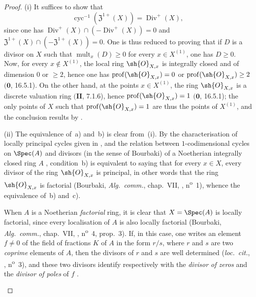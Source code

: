 \begin{proof}
(i) It suffices to show that
\[
\label{IV.21.6.9.1}
  \operatorname{cyc}^{-1}(\mathfrak{Z}^{1+}(X))=\operatorname{Div}^+(X),
  \tag{21.6.9.1}
\]
since one has $\operatorname{Div}^+(X)\cap(-\operatorname{Div}^+(X))=0$ and $\mathfrak{Z}^{1+}(X)\cap(-\mathfrak{Z}^{1+}(X))=0$.
One is thus reduced to proving that if $D$ is a divisor on $X$ such that $\operatorname{mult}_x(D)\geq 0$ for every $x\in X^{(1)}$, one has $D\geq 0$.
Now, for every $x\notin X^{(1)}$, the local ring $\sh{O}_{X,x}$ is integrally closed and of dimension $0$ or $\geq 2$, hence one has $\operatorname{prof}(\sh{O}_{X,x})=0$ or $\operatorname{prof}(\sh{O}_{X,x})\geq 2$ $(\mathbf{0}$, 16.5.1).
On the other hand, at the points $x\in X^{(1)}$, the ring $\sh{O}_{X,x}$ is a discrete valuation ring $(\mathbf{II}$, 7.1.6), hence $\operatorname{prof}(\sh{O}_{X,x})=1$ $(\mathbf{0}$, 16.5.1);
the only points of $X$ such that $\operatorname{prof}(\sh{O}_{X,x})=1$ are thus the points of $X^{(1)}$, and the conclusion results by .

(ii) The equivalence of~a) and~b) is clear from~(i).
By the characterisation of locally principal cycles given in , and the relation between $1$-codimensional cycles on $\Spec(A)$ and divisors (in the sense of Bourbaki) of a Noetherian integrally closed ring $A$ , condition~b) is equivalent to saying that for every $x\in X$, every divisor of the ring $\sh{O}_{X,x}$ is principal, in other words that the ring $\sh{O}_{X,x}$ is factorial (Bourbaki, \emph{Alg.~comm.}, chap.~VII, , n\textsuperscript{o}~1), whence the equivalence of~b) and~c).

\begin{env}[21.6.9.2]
\label{IV.21.6.9.2}
When $A$ is a Noetherian \emph{factorial} ring, it is clear that $X=\Spec(A)$ is locally factorial, since every localisation of $A$ is also locally factorial (Bourbaki, \emph{Alg.~comm.}, chap.~VII, , n\textsuperscript{o}~4, prop.~3).
If, in this case, one writes an element $f\neq 0$ of the field of fractions $K$ of $A$ in the form $r/s$, where $r$ and $s$ are two \emph{coprime} elements of $A$, then the divisors of $r$ and $s$ are well determined (\emph{loc.~cit.}, , n\textsuperscript{o}~3), and these two divisors identify respectively with the \emph{divisor of zeros} and the \emph{divisor of poles} of $f$ .
\end{env}
\end{proof}

